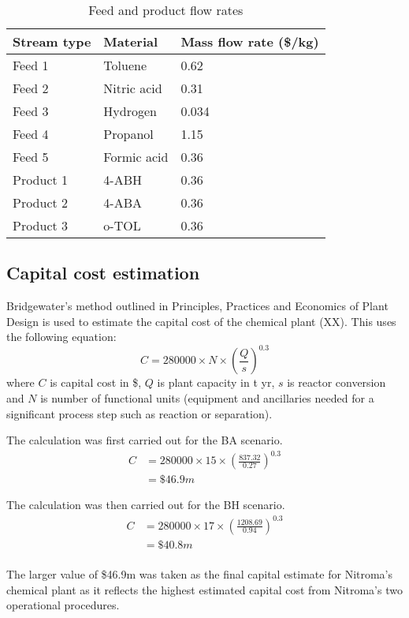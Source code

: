 \begin{table}[h] 
\centering
\caption{Feed and product flow rates}
\label{tab:costing-flows}
\begin{tabular}{lll}
    \toprule
    Stream type    & Material    & Mass flow rate (\$/kg) \\\midrule
    Feed 1     & Toluene     & 0.62                     \\
    Feed 2     & Nitric acid & 0.31                      \\
    Feed 3     & Hydrogen    & 0.034                     \\
    Feed 4     & Propanol    & 1.15                      \\
    Feed 5     & Formic acid & 0.36                      \\ 
    Product 1  & 4-ABH       & 0.36                      \\
    Product 2  & 4-ABA       & 0.36                      \\
    Product 3  & o-TOL       & 0.36                      \\\bottomrule
\end{tabular}
\end{table}

\subsection{Capital cost estimation}

Bridgewater's method outlined in Principles, Practices and Economics of Plant Design is used to estimate the capital cost of the chemical plant (XX). This uses the following equation:
\begin{equation}
    C= \num{280000} \times N \times \left(\frac{Q}{s}\right)^{0.3}
\end{equation}
where $C$ is capital cost in \$, $Q$ is  plant capacity in t yr, $s$ is reactor conversion and $N$ is number of functional units (equipment and ancillaries needed for a significant process step such as reaction or separation).

The calculation was first carried out for the BA scenario.
\begin{align*}
C &= \num{280000} \times 15 \times \left(\frac{837.32}{0.27}\right)^{0.3}  \\
  &= \$46.9m 
\end{align*}

The calculation was then carried out for the BH scenario.
\begin{align*}
C &= 280000 \times 17 \times \left(\frac{1208.69}{0.94}\right)^{0.3}  \\
  &=\$40.8m 
\end{align*}
\\
The larger value of \$46.9m was taken as the final capital estimate for Nitroma's chemical plant as it reflects the highest estimated capital cost from Nitroma's two operational procedures.